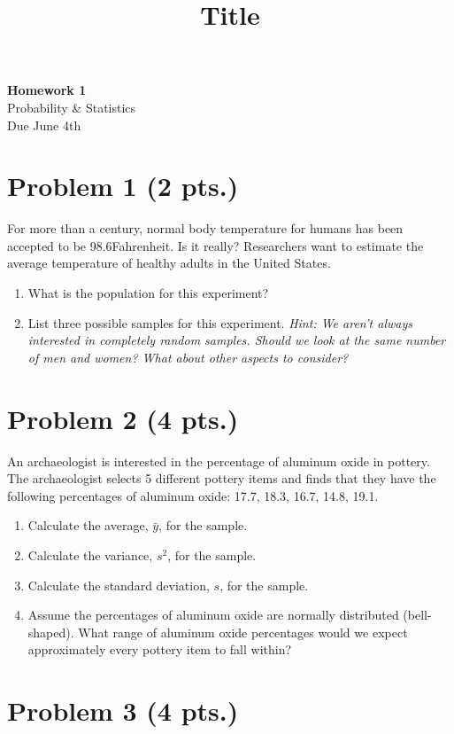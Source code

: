 \documentclass[11pt]{article}
\theoremstyle{definition}
\begin{document}
\title{Title}

\thispagestyle{empty}

\begin{center}
{\LARGE \bf Homework 1} \\
{\large Probability \& Statistics} \\
{\large Due June 4th}
\end{center}
\section*{Problem 1 (2 pts.)}

For more than a century, normal body temperature for humans has been accepted to be 98.6\degree \space Fahrenheit. Is it really? Researchers want to estimate the average temperature of healthy adults in the United States.

\begin{enumerate}
	\item What is the population for this experiment?
	\item List three possible samples for this experiment. \textit{Hint: We aren't always interested in completely random samples. Should we look at the same number of men and women? What about other aspects to consider?}
\end{enumerate}

\section*{Problem 2 (4 pts.)}

An archaeologist is interested in the percentage of aluminum oxide in pottery. The archaeologist selects 5 different pottery items and finds that they have the following percentages of aluminum oxide: 17.7, 18.3, 16.7, 14.8, 19.1.

\begin{enumerate}
	\item Calculate the average, $\bar{y}$, for the sample.
	\item Calculate the variance, $s^2$, for the sample.
	\item Calculate the standard deviation, $s$, for the sample.
	\item Assume the percentages of aluminum oxide are normally distributed (bell-shaped). What range of aluminum oxide percentages would we expect approximately every pottery item to fall within?
\end{enumerate}

\section*{Problem 3 (4 pts.)}
\end{document}
